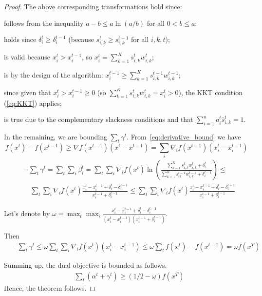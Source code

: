 \begin{proof}
%
The above corresponding transformations hold since:
\begin{compactenum}[(1)]
	\setcounter{enumi}{2}
	\item follows from the inequality $a - b \leq a \ln(a/b)$ for all $0 < b \leq a$;
	\item holds since $\delta_{i}^{t} \geq \delta_{i}^{t-1}$ (because $s_{i,k}^{t} \geq s_{i,k}^{t-1}$ for all $i,k,t$);
	\item is valid because $x_{i}^{t} > x_{i}^{t-1}$, so $x_{i}^{t} = \sum_{k=1}^{K}  s_{i,k}^{t} w_{i,k}^{t}$;
	\item is by the design of the algorithm: $x_{i}^{t-1} \geq \sum_{k=1}^{K}  s_{i,k}^{t-1} w_{i,k}^{t-1}$;
	\setcounter{enumi}{5}
	\item since given that $x_{i}^{t} > x_{i}^{t-1} \geq 0$
	(so $\sum_{k=1}^{K}  s_{i,k}^{t} w_{i,k}^{t} = x_{i}^{t} > 0$), the KKT condition (\ref{eq:KKT}) applies;
	\item is true due to the complementary slackness conditions
		and that $\sum_{i=1}^{n} a_{i}^{t}  \hat{s}_{i,k}^{t} = 1$.
\end{compactenum}

In the remaining, we are bounding $\sum_{t} \gamma^{t}$. From~\ref{eq:derivative_bound} we have
\[f(x^{t}) - f(x^{t-1}) \ge \nabla f(x^{t-1})(x^{t}-x^{t-1}) = \sum_{i}\nabla_{i}f(x^{t-1})(x^{t}_{i} - x^{t-1}_{i})\]
\begin{align*}
  &-\sum_{t}\gamma^{t} = \sum_{t}\sum_{i}\beta_{i}^{t} = \sum_{t}\sum_{i}\nabla_{i} f(x^{t})\ln \left( \frac{\sum_{k=1}^{K} s_{i,k}^{t} w_{i,k}^{t} + \delta_{i}^{t}}{\sum_{k=1}^{K}  s_{ik}^{t-1}w_{i,k}^{t-1}  + \delta_{i}^{t-1}} \right) \le \\
  &\quad \sum_{t}\sum_{i}\nabla_{i} f(x^{t})\frac{x_{i}^{t} - x_{i}^{t-1} + \delta_{i}^{t} - \delta_{i}^{t-1}}{x_{i}^{t-1}  + \delta_{i}^{t-1}} \le \sum_{t}\sum_{i}\nabla_{i} f(x^{t})\frac{x_{i}^{t} - x_{i}^{t-1} + \delta_{i}^{t} - \delta_{i}^{t-1}}{x_{i}^{t-1}  + \delta_{i}^{t-1}}
\end{align*}

Let's denote by $\omega = \max_{t}\max_{i}\frac{x_{i}^{t} - x_{i}^{t-1} + \delta_{i}^{t} - \delta_{i}^{t-1}}{(x_{i}^{t} - x_{i}^{t-1})(x_{i}^{t-1}  + \delta_{i}^{t-1})}$.


Then
\begin{align*}
  &-\sum_{t}\gamma^{t} \le \omega\sum_{t}\sum_{i}\nabla_{i} f(x^{t})(x_{i}^{t} - x_{i}^{t-1}) \le \omega\sum_{t}f(x^{t}) - f(x^{t-1}) = \omega f(x^{T})
\end{align*}

Summing up, the dual objective is bounded as follows.
\begin{align*}
 &\sum_{t} (\alpha^{t} + \gamma^{t}) \geq (1/2-\omega) f(x^{T})
\end{align*}
Hence, the theorem follows.
\end{proof}


